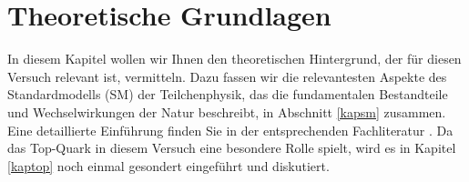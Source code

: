 \section{Theoretische Grundlagen}
\label{sm_chapter}
In diesem Kapitel wollen wir Ihnen den theoretischen Hintergrund, der f\"ur diesen Versuch relevant ist, vermitteln. Dazu fassen wir die relevantesten Aspekte des Standardmodells (SM) der Teilchenphysik, das die fundamentalen Bestandteile und Wechselwirkungen der Natur beschreibt, in Abschnitt \ref{kapsm} zusammen. Eine detaillierte Einf\"uhrung finden Sie in der entsprechenden Fachliteratur \cite{Griffiths, Berger}. Da das Top-Quark in diesem Versuch eine besondere Rolle spielt, wird es in Kapitel \ref{kaptop} noch einmal gesondert eingef\"uhrt und diskutiert.

